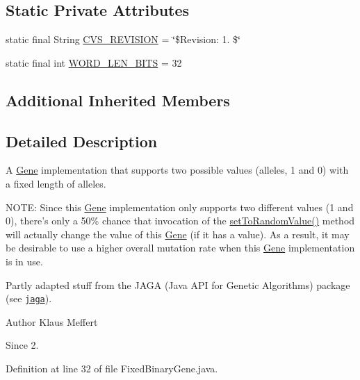 \subsection*{Static Private Attributes}
\begin{DoxyCompactItemize}
\item 
static final String \hyperlink{classorg_1_1jgap_1_1impl_1_1_fixed_binary_gene_afabb681b7d100e61d94c79187c136559}{C\-V\-S\-\_\-\-R\-E\-V\-I\-S\-I\-O\-N} = \char`\"{}\$Revision\-: 1. \$\char`\"{}
\item 
static final int \hyperlink{classorg_1_1jgap_1_1impl_1_1_fixed_binary_gene_ab3e70c8e8c88370485c33fb937db2eda}{W\-O\-R\-D\-\_\-\-L\-E\-N\-\_\-\-B\-I\-T\-S} = 32
\end{DoxyCompactItemize}
\subsection*{Additional Inherited Members}


\subsection{Detailed Description}
A \hyperlink{interfaceorg_1_1jgap_1_1_gene}{Gene} implementation that supports two possible values (alleles, 1 and 0) with a fixed length of alleles. 

N\-O\-T\-E\-: Since this \hyperlink{interfaceorg_1_1jgap_1_1_gene}{Gene} implementation only supports two different values (1 and 0), there's only a 50\% chance that invocation of the \hyperlink{classorg_1_1jgap_1_1impl_1_1_fixed_binary_gene_aa827e651eccd75a92b29e72563ebb29d}{set\-To\-Random\-Value()} method will actually change the value of this \hyperlink{interfaceorg_1_1jgap_1_1_gene}{Gene} (if it has a value). As a result, it may be desirable to use a higher overall mutation rate when this \hyperlink{interfaceorg_1_1jgap_1_1_gene}{Gene} implementation is in use. 

Partly adapted stuff from the J\-A\-G\-A (Java A\-P\-I for Genetic Algorithms) package (see \href{http://www.jaga.org}{\tt jaga}).

\begin{DoxyAuthor}{Author}
Klaus Meffert 
\end{DoxyAuthor}
\begin{DoxySince}{Since}
2. 
\end{DoxySince}


Definition at line 32 of file Fixed\-Binary\-Gene.\-java.



